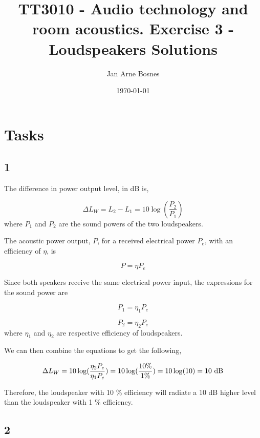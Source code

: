 \documentclass{article}
\title{TT3010 - Audio technology and room acoustics. \newline Exercise 3 - Loudspeakers \newline Solutions}
\author{Jan Arne Bosnes}
\date{\today}
\begin{document}
\maketitle

\section*{Tasks}

\subsection*{1}

The difference in power output level, in dB is,

\begin{equation}
    \Delta L_W = L_2 - L_1 = 10\log(\frac{P_2}{P_1})
\end{equation}
where $P_1$ and $P_2$ are the sound powers of the two loudspeakers.

\noindent The acoustic power output, $P$, for a received electrical power $P_e$, with an efficiency of $\eta$, is

\begin{equation}
    P= \eta P_e
\end{equation}

Since both speakers receive the same electrical power input, the expressions for the sound power are

\begin{equation}
    P_1= \eta_1 P_e
\end{equation}

\begin{equation}
    P_2= \eta_2 P_e
\end{equation}
where $\eta_1$ and $\eta_2$ are respective efficiency of loudspeakers.

We can then combine the equations to get the following,

\begin{equation}
    \Delta L_W = 10\log(\frac{\eta_2 P_e}{\eta_1 P_e}) = 10\log(\frac{10 \%}{ 1 \%}) = 10 \log(10) = 10 \ {\rm dB}
\end{equation}

Therefore, the loudspeaker with 10 \% efficiency will radiate a 10 dB higher level than the loudspeaker with 1 \% efficiency.

\subsection*{2}
\end{document}
